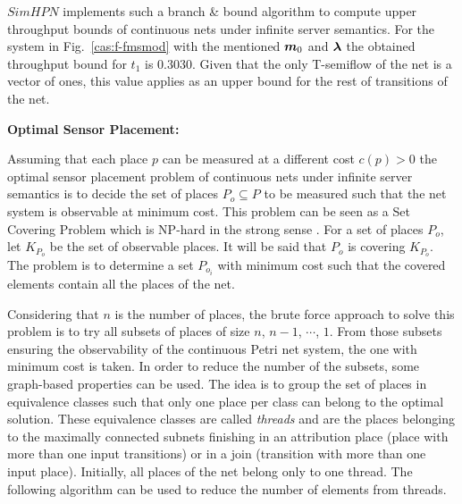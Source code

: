 $SimHPN$ implements such a branch \& bound algorithm to compute upper throughput
bounds of continuous nets under infinite server semantics. For the system in
Fig.~\ref{cas:f-fmsmod} with the mentioned $\mo$ and $\la$ the obtained
throughput bound for $t_1$ is $0.3030$. Given that the only T-semiflow of the
net is a vector of ones, this value applies as an upper bound for the rest of
transitions of the net.

{\bf Optimal Sensor Placement:}

Assuming that each place $p$ can be measured at a different cost  $c(p) > 0$  the optimal sensor placement problem of continuous nets under infinite server semantics is to decide the set of places $P_o \subseteq P$ to be measured such that the net system is observable at minimum cost. This problem can be seen as a Set Covering Problem which is NP-hard in the strong sense \cite{SCP79}. For a set of places $P_o$, let $K_{P_o}$ be the set of observable places. It will be said that $P_o$ is covering $K_{P_o}$. The problem is to determine a set $P_{o_i}$ with minimum cost such that the covered elements contain all the places of the net.

Considering that $n$ is the number of places, the brute force approach to solve this problem is to try all subsets of places of size $n$, $n-1$, $\cdots$, $1$.  From those subsets ensuring the observability of the continuous Petri net system, the one with minimum cost is taken. In order to reduce the number of the subsets, some graph-based properties can be used. The idea is to group the set of places in equivalence classes such that only one place per  class can belong to the optimal solution.  These equivalence classes are called \emph{threads} and are the places belonging to the maximally connected subnets finishing in an attribution place (place with more than one input transitions) or in a join (transition with more than one input place). Initially, all places of the net belong only to one thread. The following algorithm can be used to reduce the number of elements from threads.



